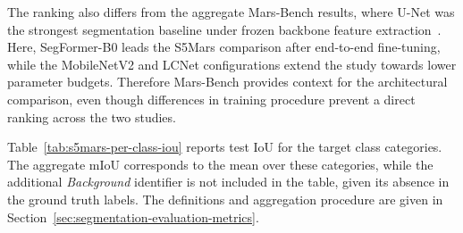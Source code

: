 The ranking also differs from the aggregate Mars-Bench results, where U-Net was the strongest segmentation baseline under frozen backbone feature extraction~\cite{purohit2025marsbench}. Here, SegFormer-B0 leads the S5Mars comparison after end-to-end fine-tuning, while the MobileNetV2 and LCNet configurations extend the study towards lower parameter budgets. Therefore Mars-Bench provides context for the architectural comparison, even though differences in training procedure prevent a direct ranking across the two studies.

Table~\ref{tab:s5mars-per-class-iou} reports test IoU for the target class categories. The aggregate mIoU corresponds to the mean over these categories, while the additional \emph{Background} identifier is not included in the table, given its absence in the ground truth labels. The definitions and aggregation procedure are given in Section~\ref{sec:segmentation-evaluation-metrics}.

